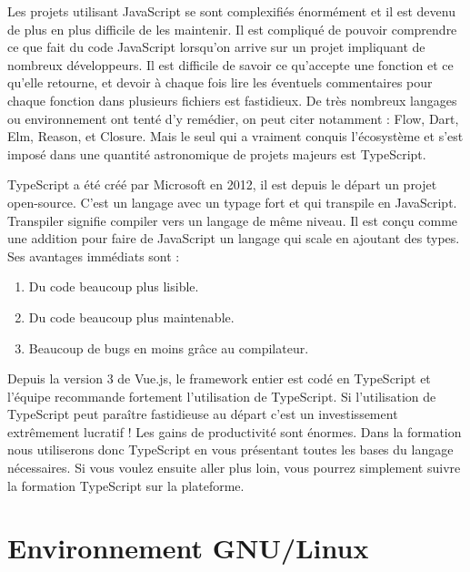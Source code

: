 Les projets utilisant {\color{monOrange}JavaScript} se sont complexifiés énormément et il est devenu de plus en plus difficile de les maintenir. Il est compliqué de pouvoir comprendre ce que fait du code {\color{monOrange}JavaScript} lorsqu'on arrive sur un projet impliquant de nombreux développeurs. Il est difficile de savoir ce qu'accepte une fonction et ce qu'elle retourne, et devoir à chaque fois lire les éventuels commentaires pour chaque fonction dans plusieurs fichiers est fastidieux. De très nombreux langages ou environnement ont tenté d'y remédier, on peut citer notamment : {\color{monOrange}Flow, Dart, Elm, Reason}, et {\color{monOrange}Closure}. Mais le seul qui a vraiment conquis l'écosystème et s'est imposé dans une quantité astronomique de projets majeurs est {\color{monOrange}TypeScript}.

{\color{monOrange}TypeScript} a été créé par {\color{monOrange}Microsoft} en 2012, il est depuis le départ un projet open-source. C'est un langage avec un typage fort et qui transpile en {\color{monOrange}JavaScript}. Transpiler signifie compiler vers un langage de même niveau. Il est conçu comme une addition pour faire de {\color{monOrange}JavaScript} un langage qui scale en ajoutant des types. Ses avantages immédiats sont :
\begin{enumerate}
\item  Du code beaucoup plus lisible.
\item  Du code beaucoup plus maintenable.
\item  Beaucoup de {\color{monOrange}bugs} en moins grâce au compilateur.
\end{enumerate}
Depuis la version 3 de {\color{monOrange}Vue.js}, le framework entier est codé en {\color{monOrange}TypeScript} et l'équipe recommande fortement l'utilisation de {\color{monOrange}TypeScript}. Si l'utilisation de {\color{monOrange}TypeScript} peut paraître fastidieuse au départ c'est un investissement extrêmement lucratif ! Les gains de productivité sont énormes. Dans la formation nous utiliserons donc {\color{monOrange}TypeScript} en vous présentant toutes les bases du langage nécessaires. Si vous voulez ensuite aller plus loin, vous pourrez simplement suivre la formation {\color{monOrange}TypeScript} sur la plateforme.


\section{Environnement GNU/Linux}

